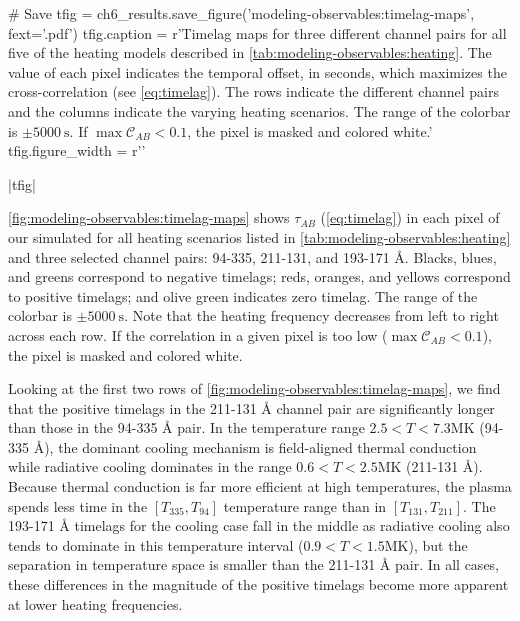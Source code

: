 \begin{pycode}
# Save
tfig = ch6_results.save_figure('modeling-observables:timelag-maps', fext='.pdf')
tfig.caption = r'Timelag maps for three different channel pairs for all five of the heating models described in \autoref{tab:modeling-observables:heating}. The value of each pixel indicates the temporal offset, in seconds, which maximizes the cross-correlation (see \autoref{eq:timelag}). The rows indicate the different channel pairs and the columns indicate the varying heating scenarios. The range of the colorbar is $\pm\SI{5000}{\second}$. If $\max{\mathcal{C}_{AB}}<0.1$, the pixel is masked and colored white.'
tfig.figure_width = r'\textwidth'
\end{pycode}
|tfig|

\autoref{fig:modeling-observables:timelag-maps} shows $\tau_{AB}$ (\autoref{eq:timelag}) in each pixel of our simulated \AR{} for all heating scenarios listed in \autoref{tab:modeling-observables:heating} and three selected channel pairs: 94-335, 211-131, and 193-171 \si{\angstrom}. Blacks, blues, and greens correspond to negative timelags; reds, oranges, and yellows correspond to positive timelags; and olive green indicates zero timelag. The range of the colorbar is $\pm\SI{5000}{\second}$. Note that the heating frequency decreases from left to right across each row. If the correlation in a given pixel is too low ($\max{\mathcal{C}_{AB}}<0.1$), the pixel is masked and colored white.

Looking at the first two rows of \autoref{fig:modeling-observables:timelag-maps}, we find that the positive timelags in the 211-131 \si{\angstrom} channel pair are significantly longer than those in the 94-335 \AA{} pair. In the temperature range $2.5<T<7.3\si{\mega\kelvin}$ (94-335 \si{\angstrom}), the dominant cooling mechanism is field-aligned thermal conduction while radiative cooling dominates in the range $0.6<T<2.5\si{\mega\kelvin}$ (211-131 \si{\angstrom}). Because thermal conduction is far more efficient at high temperatures, the plasma spends less time in the $[T_{335},T_{94}]$ temperature range than in $[T_{131},T_{211}]$. The 193-171 \si{\angstrom} timelags for the cooling case fall in the middle as radiative cooling also tends to dominate in this temperature interval ($0.9<T<1.5\si{\mega\kelvin}$), but the separation in temperature space is smaller than the 211-131 \si{\angstrom} pair. In all cases, these differences in the magnitude of the positive timelags become more apparent at lower heating frequencies.


